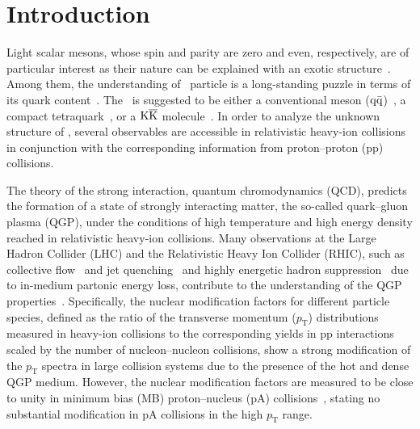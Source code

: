 
\section{Introduction}

Light scalar mesons, whose spin and parity are zero and even, respectively, are of particular interest as their nature can be explained with an exotic structure~\cite{ParticleDataGroup:2022pth}. Among them, the understanding of \fzero\ particle is a long-standing puzzle in terms of its quark content~\cite{ExHIC:2010gcb, Jaffe:1976ig, Maiani:2004uc}. The \fzero\ is suggested to be either a conventional meson ($\rm{}q\bar{q}$)~\cite{Chen:2003za}, a compact tetraquark~\cite{Achasov:2020aun}, or a $\rm{}K\overline{K}$ molecule~\cite{Ahmed:2020kmp}. In order to analyze the unknown structure of \fzero, several observables are accessible in relativistic heavy-ion collisions in conjunction with the corresponding information from proton--proton (pp) collisions. 

The theory of the strong interaction, quantum chromodynamics (QCD), predicts the formation of a state of strongly interacting matter, the so-called quark--gluon plasma (QGP), under the conditions of high temperature and high energy density reached in relativistic heavy-ion collisions. Many observations at the Large Hadron Collider (LHC) and the Relativistic Heavy Ion Collider (RHIC), such as collective flow~\cite{Bhalerao:2020ulk, ALICE:2019zfl, Adams:2005dq, Adcox:2004mh} and jet quenching~\cite{ALICE:2019qyj, ATLAS:2010isq, PHENIX:2010nlr} and highly energetic hadron suppression~\cite{ALICE:2019hno, PHENIX:2006ujp} due to in-medium partonic energy loss, contribute to the understanding of the QGP properties~\cite{Heinz:2000bk, ALICE:2022wpn}. Specifically, the nuclear modification factors for different particle species, defined as the ratio of the transverse momentum ($p_{\mathrm{T}}$) distributions measured in heavy-ion collisions to the corresponding yields in pp interactions scaled by the number of nucleon--nucleon collisions, show a strong modification of the $p_{\mathrm{T}}$ spectra in large collision systems due to the presence of the hot and dense QGP medium. However, the nuclear modification factors are measured to be close to unity in minimum bias (MB) proton--nucleus (pA) collisions~\cite{ALICE:2016dei}, stating no substantial modification in pA collisions in the high $p_{\mathrm{T}}$ range. 

